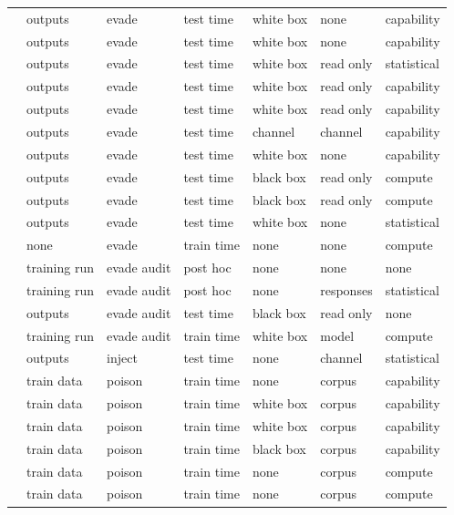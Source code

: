 \begin{landscape}
\begin{longtable}{rllllll}
\cite{SYLZZRB19} & outputs & evade & test time & white box & none & capability \\
\cite{SSTTM18} & outputs & evade & test time & white box & none & capability \\
\cite{MHS22} & outputs & evade & test time & white box & read only & statistical \\
\cite{CASDFCMH21} & outputs & evade & test time & white box & read only & capability \\
\cite{TSETM19} & outputs & evade & test time & white box & read only & capability \\
\cite{HDDH25} & outputs & evade & test time & channel & channel & capability \\
\cite{SWKBC25} & outputs & evade & test time & white box & none & capability \\
\cite{FK24} & outputs & evade & test time & black box & read only & compute \\
\cite{SSZHTE24} & outputs & evade & test time & black box & read only & compute \\
\cite{MHS19} & outputs & evade & test time & white box & none & statistical \\
\cite{DNV19} & none & evade & train time & none & none & compute \\
\cite{Sha23} & training run & evade audit & post hoc & none & none & none \\
\cite{NK26} & training run & evade audit & post hoc & none & responses & statistical \\
\cite{RCA24} & outputs & evade audit & test time & black box & read only & none \\
\cite{ZCSL24} & training run & evade audit & train time & white box & model & compute \\
\cite{ZYWGW25} & outputs & inject & test time & none & channel & statistical \\
\cite{SKL17} & train data & poison & train time & none & corpus & capability \\
\cite{LXSWLGZX25} & train data & poison & train time & white box & corpus & capability \\
\cite{LCMER25} & train data & poison & train time & white box & corpus & capability \\
\cite{MMM19} & train data & poison & train time & black box & corpus & capability \\
\cite{DKKLMS16} & train data & poison & train time & none & corpus & compute \\
\cite{DIKR25} & train data & poison & train time & none & corpus & compute \\

\end{longtable}
\end{landscape}
